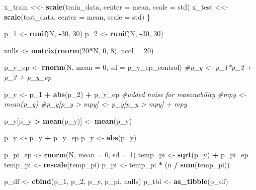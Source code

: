 \documentclass[12pt,twoside]{reedthesis}
\newenvironment{Shaded}{\begin{snugshade}}{\end{snugshade}}
\newcommand{\KeywordTok}[1]{\textcolor[rgb]{0.13,0.29,0.53}{\textbf{#1}}}
\newcommand{\DataTypeTok}[1]{\textcolor[rgb]{0.13,0.29,0.53}{#1}}
\newcommand{\DecValTok}[1]{\textcolor[rgb]{0.00,0.00,0.81}{#1}}
\newcommand{\StringTok}[1]{\textcolor[rgb]{0.31,0.60,0.02}{#1}}
\newcommand{\CommentTok}[1]{\textcolor[rgb]{0.56,0.35,0.01}{\textit{#1}}}
\newcommand{\OperatorTok}[1]{\textcolor[rgb]{0.81,0.36,0.00}{\textbf{#1}}}
\newcommand{\NormalTok}[1]{#1}
\begin{document}
\begin{Shaded}
\begin{Highlighting}[]
{\NormalTok{  x_train <<-}\StringTok{ }\KeywordTok{scale}\NormalTok{(train_data, }\DataTypeTok{center =}\NormalTok{ mean, }\DataTypeTok{scale =}\NormalTok{ std)}
\NormalTok{  x_test <<-}\StringTok{ }\KeywordTok{scale}\NormalTok{(test_data, }\DataTypeTok{center =}\NormalTok{ mean, }\DataTypeTok{scale =}\NormalTok{ std)}
\NormalTok{\}}

\NormalTok{p_}\DecValTok{1}\NormalTok{ <-}\StringTok{ }\KeywordTok{runif}\NormalTok{(N, }\OperatorTok{-}\DecValTok{30}\NormalTok{, }\DecValTok{30}\NormalTok{)}
\NormalTok{p_}\DecValTok{2}\NormalTok{ <-}\StringTok{ }\KeywordTok{runif}\NormalTok{(N, }\OperatorTok{-}\DecValTok{30}\NormalTok{, }\DecValTok{30}\NormalTok{)}

\NormalTok{nulls <-}\StringTok{ }\KeywordTok{matrix}\NormalTok{(}\KeywordTok{rnorm}\NormalTok{(}\DecValTok{20}\OperatorTok{*}\NormalTok{N, }\DecValTok{0}\NormalTok{, }\DecValTok{8}\NormalTok{), }\DataTypeTok{ncol =} \DecValTok{20}\NormalTok{)}

\NormalTok{p_y_ep <-}\StringTok{ }\KeywordTok{rnorm}\NormalTok{(N, }\DataTypeTok{mean =} \DecValTok{0}\NormalTok{, }\DataTypeTok{sd =}\NormalTok{ p_y_ep_control)}
\CommentTok{#p_y <- p_1*p_2 + p_3 + p_y_ep}

\NormalTok{p_y <-}\StringTok{ }\NormalTok{p_}\DecValTok{1} \OperatorTok{+}\StringTok{ }\KeywordTok{abs}\NormalTok{(p_}\DecValTok{2}\NormalTok{) }\OperatorTok{+}\StringTok{ }\NormalTok{p_y_ep }\CommentTok{#added noise for reasonability}
\CommentTok{#mpy <- mean(p_y)}
\CommentTok{#p_y[p_y > mpy] <- p_y[p_y > mpy] + mpy}

\NormalTok{p_y[p_y }\OperatorTok{>}\StringTok{ }\KeywordTok{mean}\NormalTok{(p_y)] <-}\StringTok{ }\KeywordTok{mean}\NormalTok{(p_y)}

\NormalTok{p_y <-}\StringTok{ }\NormalTok{p_y }\OperatorTok{+}\StringTok{ }\NormalTok{p_y_ep}
\NormalTok{p_y <-}\StringTok{ }\KeywordTok{abs}\NormalTok{(p_y)}

\NormalTok{p_pi_ep <-}\StringTok{ }\KeywordTok{rnorm}\NormalTok{(N, }\DataTypeTok{mean =} \DecValTok{0}\NormalTok{, }\DataTypeTok{sd =} \DecValTok{1}\NormalTok{)}
\NormalTok{temp_pi <-}\StringTok{ }\KeywordTok{sqrt}\NormalTok{(p_y) }\OperatorTok{+}\StringTok{ }\NormalTok{p_pi_ep}
\NormalTok{temp_pi <-}\StringTok{ }\KeywordTok{rescale}\NormalTok{(temp_pi)}
\NormalTok{p_pi <-}\StringTok{ }\NormalTok{temp_pi }\OperatorTok{*}\StringTok{ }\NormalTok{(n }\OperatorTok{/}\StringTok{ }\KeywordTok{sum}\NormalTok{(temp_pi))}

\NormalTok{p_df <-}\StringTok{ }\KeywordTok{cbind}\NormalTok{(p_}\DecValTok{1}\NormalTok{, p_}\DecValTok{2}\NormalTok{, p_y, p_pi, nulls)}
\NormalTok{p_tbl <-}\StringTok{ }\KeywordTok{as_tibble}\NormalTok{(p_df)}

}
\end{Highlighting}
\end{Shaded}
\end{document}
